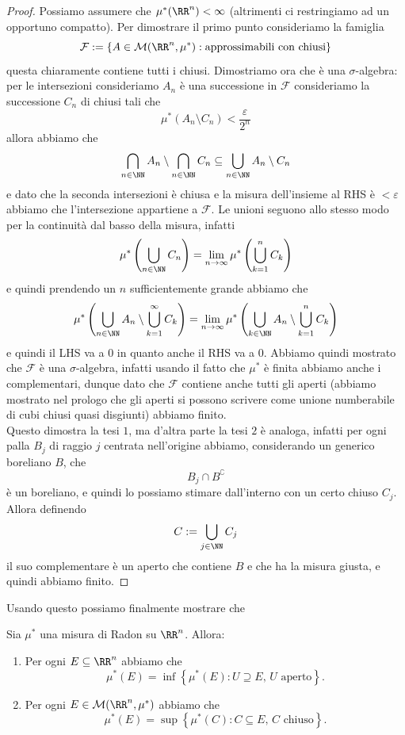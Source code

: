 \documentclass[11pt]{scrartcl}
\begin{document}
	\begin{proof}
		Possiamo assumere che $\mu^*(\RR^n)<\infty$ (altrimenti ci restringiamo ad un opportuno compatto). Per dimostrare il primo punto consideriamo la famiglia
		$$\mathcal{F}:=\left\{A\in \mathcal{M}(\RR^n,\mu^*):  \text{approssimabili con chiusi}\right\}$$
		questa chiaramente contiene tutti i chiusi. Dimostriamo ora che è una $\sigma$-algebra: per le intersezioni consideriamo $A_n$ è una successione in $\mathcal{F}$ consideriamo la successione $C_n$ di chiusi tali che
		$$\mu^*(A_n\setminus C_n)<\frac{\varepsilon}{2^n}$$
		allora abbiamo che 
		$$\bigcap_{n\in\NN}A_n \setminus \bigcap_{n\in\NN}C_n \subseteq \bigcup_{n\in\NN}A_n\setminus C_n$$
		e dato che la seconda intersezioni è chiusa e la misura dell'insieme al RHS è $<\varepsilon$ abbiamo che l'intersezione appartiene a $\mathcal{F}$. Le unioni seguono allo stesso modo per la continuità dal basso della misura, infatti
		$$\mu^*\left(\bigcup_{n\in\NN}C_n\right)=\lim_{n\to\infty} \mu^*\left(\bigcup_{k=1}^n C_k\right)$$
		e quindi prendendo un $n$ sufficientemente grande abbiamo che 
		$$\mu^*\left(\bigcup_{n\in\NN}A_n \setminus \bigcup_{k=1}^\infty C_k \right)=\lim_{n\to\infty}\mu^*\left(\bigcup_{k\in\NN}A_n\setminus \bigcup_{k=1}^nC_k\right)$$
		e quindi il LHS va a $0$ in quanto anche il RHS va a $0$. Abbiamo quindi mostrato che $\mathcal{F}$ è una $\sigma$-algebra, infatti usando il fatto che $\mu^*$ è finita abbiamo anche i complementari, dunque dato che $\mathcal{F}$ contiene anche tutti gli aperti (abbiamo mostrato nel prologo che gli aperti si possono scrivere come unione numberabile di cubi chiusi quasi disgiunti) abbiamo finito. \\
		Questo dimostra la tesi $1$, ma d'altra parte la tesi $2$ è analoga, infatti per ogni palla $B_j$ di raggio $j$ centrata nell'origine abbiamo, considerando un generico boreliano $B$, che
		$$B_j\cap B^\complement$$ 
		è un boreliano, e quindi lo possiamo stimare dall'interno con un certo chiuso $C_j$. Allora definendo
		$$C:=\bigcup_{j\in\NN} C_j$$
		il suo complementare è un aperto che contiene $B$ e che ha la misura giusta, e quindi abbiamo finito. 
	\end{proof}
	Usando questo possiamo finalmente mostrare che
	\begin{theorem}[di Approssimabilità]
		Sia $\mu^*$ una misura di Radon su $\RR^n$. Allora:
		\begin{enumerate}
			\item Per ogni $E\subseteq \RR^n$ abbiamo che 
			$$\mu^*(E)=\inf\left\{\mu^*(E):U\supseteq E,\,U\text{ aperto}\right\}.$$
			\item Per ogni $E\in \mathcal{M}(\RR^n,\mu^*)$ abbiamo che
			$$\mu^*(E)=\sup\left\{\mu^*(C):C\subseteq E,\,C\text{ chiuso}\right\}.$$
		\end{enumerate}
	\end{theorem}
\end{document}
